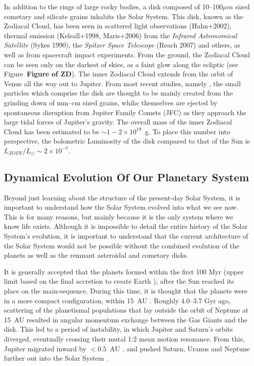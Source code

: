     
    
    In addition to the rings of large rocky bodies, a disk composed of 10--100$\mu m$ sized cometary and silicate grains inhabits the Solar System. This disk, known as the Zodiacal Cloud, has been seen in scattered light observations (Hahn+2002), thermal emission (Kelsall+1998, Maris+2006) from the \textit{Infrared Astronomical Satellite} (Sykes 1990), the \textit{Spitzer Space Telescope} (Reach 2007) and others, as well as from spacecraft impact experiments. From the ground, the Zodiacal Cloud can be seen only on the darkest of skies, as a faint glow along the ecliptic (see Figure~\textbf{Figure of ZD}). The inner Zodiacal Cloud extends from the orbit of Venus all the way out to Jupiter. From most recent studies, namely \citet{Nesvorny2010}, the small particles which comprise the disk are thought to be mainly created from the grinding down of mm--cm sized grains, whihc themselves are ejected by spontaneous disruption from Jupiter Family Comets (JFC) as they approach the large tidal forces of Jupiter's gravity. The overall mass of the inner Zodiacal Cloud has been estimated to be $\sim1-2\times10^{19}$~g. To place this number into perspective, the bolometric Luminosity of the disk compared to that of the Sun is $L_{ZODY}/L_\odot \sim 2\times10^{-7}$. 


    
    \subsection{Dynamical Evolution Of Our Planetary System}
    
    Beyond just learning about the structure of the present-day Solar System, it is important to understand how the Solar System evolved into what we see now. This is for many reasons, but mainly because it is the only system where we know life exists. Although it is impossible to detail the entire history of the Solar System's evolution, it is important to understand that the current architecture of the Solar System would not be possible without the combined evolution of the planets as well as the remnant asteroidal and cometary disks. 
    
    It is generally accepted that the planets formed within the first 100 Myr (upper limit based on the final accretion to create Earth \citep{Allegre2008}), after the Sun reached its place on the main-sequence. During this time, it is thought that the planets were in a more compact configuration, within 15~AU \citep{Batygnin  Brown 2010}. Roughly 4.0--3.7 Gyr ago, scattering of the planetismal populations that lay outside the orbit of Neptune at 15~AU resulted in angular momentum exchange between the Gas Giants and the disk. This led to a period of instability, in which Jupiter and Saturn's orbits diverged, eventually crossing their mutal 1:2 mean motion resonance. From this, Jupiter migrated inward by $<0.5$~AU \citep{Mordibelli2010}, and pushed Saturn, Uranus and Neptune further out into the Solar System \citep{Tsiganis2005}. 
    
